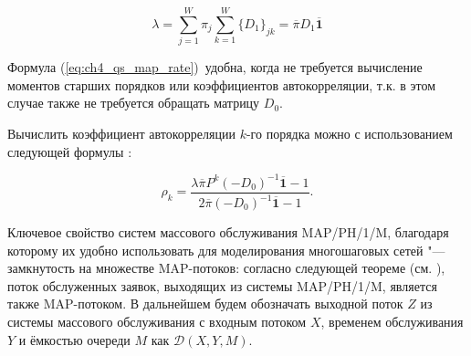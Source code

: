 \begin{equation}
	\label{eq:ch4_qs_map_rate}
	\lambda = \sum\limits_{j=1}^{W} \pi_j \sum\limits_{k=1}^{W} \{D_1\}_{jk} = \overline{\pi} D_1 \overline{\mathbf{1}}
\end{equation}

Формула (\ref{eq:ch4_qs_map_rate})~удобна, когда не требуется вычисление моментов старших порядков или коэффициентов автокорреляции, т.к. в этом случае также не требуется обращать матрицу $D_0$.

Вычислить коэффициент автокорреляции $k$-го порядка можно с использованием следующей формулы \cite{Horvath2005}:

\begin{equation}
	\label{eq:ch4_map_lag_k}
	\rho_k = \frac{\lambda \overline{\pi} P^k (-D_0)^{-1} \overline{\mathbf{1}} - 1}{2 \overline{\pi} (-D_0)^{-1} \overline{\mathbf{1}} - 1}.
\end{equation}




Ключевое свойство систем массового обслуживания MAP/PH/1/M, благодаря которому их удобно использовать для моделирования многошаговых сетей "--- замкнутость на множестве MAP-потоков: согласно следующей теореме (см. \cite{VishnevskyDudin2018}), поток обслуженных заявок, выходящих из системы MAP/PH/1/M, является также MAP-потоком. В дальнейшем будем обозначать выходной поток $Z$ из системы массового обслуживания с входным потоком $X$, временем обслуживания $Y$ и ёмкостью очереди $M$ как $\mathcal{D}(X, Y, M)$.


